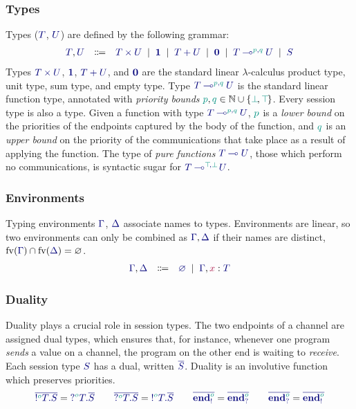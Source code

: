 \documentclass[main.tex]{subfiles}
\begin{document}
\subsubsection*{Types}
Types ($\ty{T}$, $\ty{U}$) are defined by the following grammar:
\[
\begin{array}{lcl}
  \ty{T}, \ty{U}
  & \Coloneqq & \ty{\typrod{T}{U}}
    \sep        \ty{\tyunit}
    \sep        \ty{\tysum{T}{U}}
    \sep        \ty{\tyvoid}
    \sep        \ty{\tylolli[\cs{p},\cs{q}]{T}{U}}
    \sep        \ty{S}
\end{array}
\]
Types $\ty{\typrod{T}{U}}$, $\ty{\tyunit}$, $\ty{\tysum{T}{U}}$, and $\ty{\tyvoid}$ are the standard linear $\lambda$-calculus product type, unit type, sum type, and empty type.
Type $\ty{\tylolli[\cs{p},\cs{q}]{T}{U}}$ is the standard linear function type, annotated with \emph{priority bounds} $\cs{p},\cs{q}\in\mathbb{N}\cup\{\cs{\pbot},\cs{\ptop}\}$.
Every session type is also a type.
Given a function with type $\ty{\tylolli[\cs{p},\cs{q}]{T}{U}}$, $\cs{p}$ is a \emph{lower bound} on the priorities of the endpoints captured by the body of the function, and $\cs{q}$ is an \emph{upper bound} on the priority of the communications that take place as a result of applying the function. The type of \emph{pure functions} $\ty{\tylolli{T}{U}}$, \ie those which perform no communications, is syntactic sugar for $\ty{\tylolli[\cs{\ptop},\cs{\pbot}]{T}{U}}$.

\subsubsection*{Environments}
Typing environments $\ty{\Gamma}$, $\ty{\Delta}$ associate names to types. Environments are linear, so two environments can only be combined as $\ty{\Gamma}, \ty{\Delta}$ if their names are distinct, \ie $\fv(\ty{\Gamma})\cap\fv(\ty{\Delta})=\varnothing$.
\[
\begin{array}{lcl}
  \ty{\Gamma}, \ty{\Delta}
  & \Coloneqq & \ty{\emptyenv}
    \sep        \ty{\Gamma}, \tmty{x}{T}
\end{array}
\]

\subsubsection*{Duality}
Duality plays a crucial role in session types. The two endpoints of a channel are assigned dual types, which ensures that, for instance, whenever one program \emph{sends} a value on a channel, the program on the other end is waiting to \emph{receive}. Each session type $\ty{S}$ has a dual, written $\ty{\co{S}}$. Duality is an involutive function which preserves priorities.
\[
  \ty{\co{\tysend[\cs{o}]{T}{S}}} = \ty{\tyrecv[\cs{o}]{T}{\co{S}}}
  \qquad
  \ty{\co{\tyrecv[\cs{o}]{T}{S}}} = \ty{\tysend[\cs{o}]{T}{\co{S}}}
  \qquad
  \ty{\co{\tyends[\cs{o}]}} = \ty{\co{\tyendr[\cs{o}]}}
  \qquad
  \ty{\co{\tyendr[\cs{o}]}} = \ty{\co{\tyends[\cs{o}]}}
\]
\end{document}
